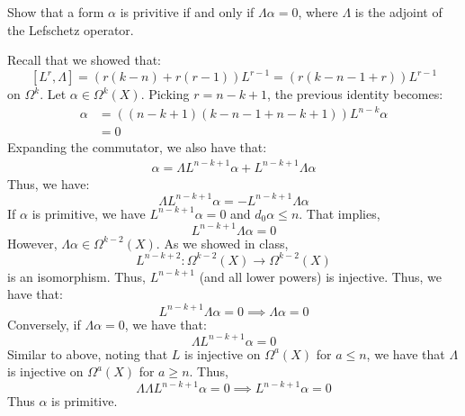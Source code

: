 \documentclass[12pt]{article}
\begin{document}
\begin{problem}{1.3}
    Show that a form $\alpha$ is privitive if and only if $\Lambda \alpha = 0$, where $\Lambda$ is the adjoint of the Lefschetz operator.
\end{problem}
\begin{solution}
    Recall that we showed that: 
    \[ [L^r, \Lambda] = (r(k-n)+r(r-1))L^{r-1} = (r(k-n-1+r))L^{r-1}\]
    on $\Omega^k$. \bbni 
    Let $\alpha \in \Omega^k(X)$. Picking $r = n-k+1$, the previous identity becomes:
    \begin{align*}
        [L^{n-k+1}, \Lambda]\alpha &= \left((n-k+1)(k-n-1+n-k+1)\right) L^{n-k}\alpha\\
        &= 0 
    \end{align*}
    Expanding the commutator, we also have that: 
    \begin{align*}
        [L^{n-k+1}, \Lambda]\alpha = \Lambda L^{n-k+1}\alpha + L^{n-k+1}\Lambda \alpha 
    \end{align*}
    Thus, we have:
    \[ \Lambda L^{n-k+1}\alpha = - L^{n-k+1}\Lambda \alpha \]
    If $\alpha$ is primitive, we have $L^{n-k+1}\alpha = 0$ and $d_0 \alpha \leq n$. That implies,
    \[ L^{n-k+1}\Lambda \alpha = 0\]
    However, $\Lambda \alpha \in \Omega^{k-2}(X)$. As we showed in class, 
    \[ L^{n-k+2}: \Omega^{k-2}(X) \to \Omega^{k-2}(X)  \]
    is an isomorphism. Thus, $L^{n-k+1}$ (and all lower powers) is injective. Thus, we have that:
    \[L^{n-k+1}\Lambda \alpha = 0 \implies \Lambda \alpha = 0\] 
    Conversely, if $\Lambda \alpha = 0$, we have that: 
    \[ \Lambda L^{n-k+1}\alpha = 0 \]
    Similar to above, noting that $L$ is injective on $\Omega^a(X)$ for $a \leq n$, we have that $\Lambda$ is injective on $\Omega^{a}(X)$ for $a \geq n$. Thus,
    \[ \Lambda \Lambda L^{n-k+1}\alpha = 0 \implies L^{n-k+1}\alpha = 0\]  
    Thus $\alpha$ is primitive.
\end{solution}
\newpage
\end{document}
